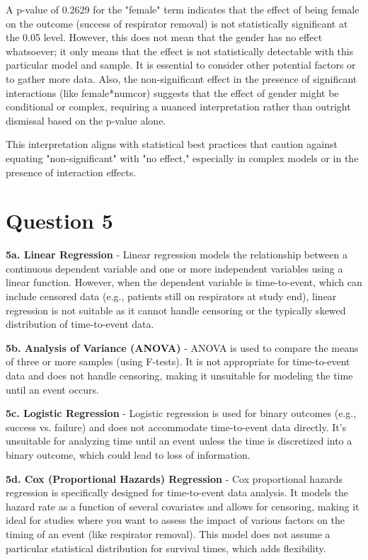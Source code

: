 \documentclass{article}
\begin{document}
A p-value of 0.2629 for the "female" term indicates that the effect of being female on the outcome (success of respirator removal) is not statistically significant at the 0.05 level. However, this does not mean that the gender has no effect whatsoever; it only means that the effect is not statistically detectable with this particular model and sample. It is essential to consider other potential factors or to gather more data. Also, the non-significant effect in the presence of significant interactions (like female*numcor) suggests that the effect of gender might be conditional or complex, requiring a nuanced interpretation rather than outright dismissal based on the p-value alone. 

This interpretation aligns with statistical best practices that caution against equating "non-significant" with "no effect," especially in complex models or in the presence of interaction effects.

\section{Question 5}

\textbf{5a. Linear Regression}
- Linear regression models the relationship between a continuous dependent variable and one or more independent variables using a linear function. However, when the dependent variable is time-to-event, which can include censored data (e.g., patients still on respirators at study end), linear regression is not suitable as it cannot handle censoring or the typically skewed distribution of time-to-event data.

\textbf{5b. Analysis of Variance (ANOVA)}
- ANOVA is used to compare the means of three or more samples (using F-tests). It is not appropriate for time-to-event data and does not handle censoring, making it unsuitable for modeling the time until an event occurs.

\textbf{5c. Logistic Regression}
- Logistic regression is used for binary outcomes (e.g., success vs. failure) and does not accommodate time-to-event data directly. It's unsuitable for analyzing time until an event unless the time is discretized into a binary outcome, which could lead to loss of information.

\textbf{5d. Cox (Proportional Hazards) Regression}
- Cox proportional hazards regression is specifically designed for time-to-event data analysis. It models the hazard rate as a function of several covariates and allows for censoring, making it ideal for studies where you want to assess the impact of various factors on the timing of an event (like respirator removal). This model does not assume a particular statistical distribution for survival times, which adds flexibility.
\end{document}
